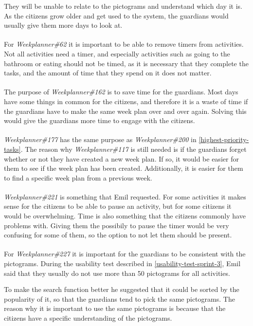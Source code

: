 They will be unable to relate to the pictograms and understand which day it is.
As the citizens grow older and get used to the system, the guardians would usually give them more days to look at.
\\\\
For \textit{Weekplanner\#62} it is important to be able to remove timers from activities. 
Not all activities need a timer, and especially activities such as going to the bathroom or eating should not be timed, as it is necessary that they complete the tasks, and the amount of time that they spend on it does not matter.
\\\\
The purpose of \textit{Weekplanner\#162} is to save time for the guardians. 
Most days have some things in common for the citizens, and therefore it is a waste of time if the guardians have to make the same week plan over and over again.
Solving this would give the guardians more time to engage with the citizens.
\\\\
\textit{Weekplanner\#177} has the same purpose as \textit{Weekplanner\#200} in \autoref{highest-priority-tasks}. 
The reason why \textit{Weekplanner\#117} is still needed is if the guardians forget whether or not they have created a new week plan.
If so, it would be easier for them to see if the week plan has been created.
Additionally, it is easier for them to find a specific week plan from a previous week.
\\\\
\textit{Weekplanner\#221} is something that Emil requested. 
For some activities it makes sense for the citizens to be able to pause an activity, but for some citizens it would be overwhelming.
Time is also something that the citizens commonly have problems with. 
Giving them the possibily to pause the timer would be very confusing for some of them, so the option to not let them should be present.
\\\\
For \textit{Weekplanner\#227} it is important for the guardians to be consistent with the pictograms.
During the usability test described in \autoref{usability-test-sprint-3}, Emil said that they usually do not use more than 50 pictograms for all activities.

To make the search function better he suggested that it could be sorted by the popularity of it, so that the guardians tend to pick the same pictograms.
The reason why it is important to use the same pictograms is because that the citizens have a specific understanding of the pictograms.

